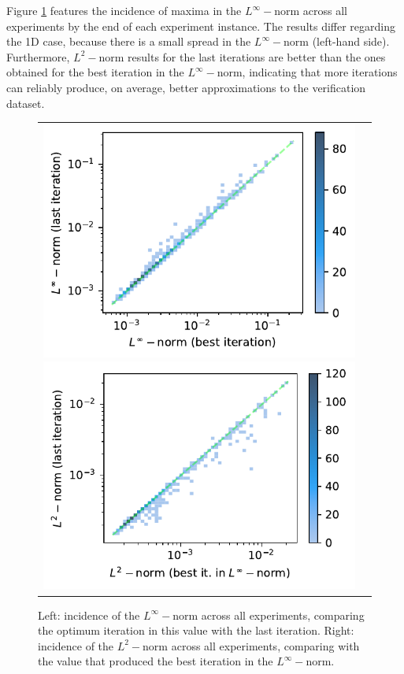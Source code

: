 \documentclass[12pt]{report} %
\begin{document}
Figure \ref{fig:parabola-results-incidence-l-norms} features the incidence of maxima in the $L^\infty-$norm across all experiments by the end of each experiment instance. The results differ regarding the 1D case, because there is a small spread in the $L^\infty-$norm (left-hand side). Furthermore, $L^2-$norm results for the last iterations are better than the ones obtained for the best iteration in the $L^\infty-$norm, indicating that more iterations can reliably produce, on average, better approximations to the verification dataset.

\begin{figure}[h]
  \hspace*{-2cm}
  \begin{tabular}{cc}
    \includegraphics[width=.6\textwidth]{imagenes/experiments/2d/statistical_2d_full_scheduler_interpolation/parabola/incidence_of_linf.pdf}
    \includegraphics[width=.6\textwidth]{imagenes/experiments/2d/statistical_2d_full_scheduler_interpolation/parabola/incidence_of_l2.pdf}
  \end{tabular}
  \caption{Left: incidence of the $L^\infty-$norm across all experiments, comparing the optimum iteration in this value with the last iteration. Right: incidence of the $L^2-$norm across all experiments, comparing with the value that produced the best iteration in the $L^\infty-$norm.}
  \label{fig:parabola-results-incidence-l-norms}
\end{figure}
\end{document}
